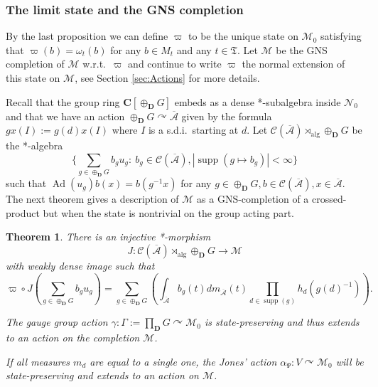 \documentclass[a4paper,12pt]{amsart}
\numberwithin{equation}{section}
\newtheorem{theo}{Theorem}[section]
\theoremstyle{definition}
\newcommand{\act}{\curvearrowright}
\newcommand{\al}{\alpha}
\newcommand{\oscrA}{{\overline{\mathscr{A}}}}
\DeclareMathOperator{\Ad}{Ad}
\DeclareMathOperator{\alg}{alg}
\newcommand{\scrC}{\mathscr C}
\newcommand{\C}{\mathbf C}
\newcommand{\D}{\mathbf D}
\newcommand{\ga}{\gamma}
\newcommand{\Ga}{\Gamma}
\newcommand{\Gd}{\oplus_\D G}
\newcommand{\scrM}{\mathscr M}
\newcommand{\scrN}{\mathscr N}
\DeclareMathOperator{\supp}{supp}
\newcommand{\fT}{\mathfrak T}
\begin{document}
\subsubsection{The limit state and the GNS completion}
By the last proposition we can define  $\varpi$ to be the unique state on $\scrM_0$ satisfying that $\varpi(b)=\omega_t(b)$ for any $b\in M_t$ and any $t\in\fT.$
Let $\scrM$ be the GNS completion of $\scrM$ w.r.t.~$\varpi$ and continue to write $\varpi$ the normal extension of this state on $\scrM$, see Section \ref{sec:Actions} for more details.

Recall that the group ring $\C[\Gd]$ embeds as a dense *-subalgebra inside $\scrN_0$ and that we have an action $\Gd\act\oscrA$ given by the formula
$gx(I):= g(d) x(I)$ where $I$ is a s.d.i.~starting at $d$.
Let $\scrC(\oscrA)\rtimes_{\alg} \Gd$ be the *-algebra 
$$\{\sum_{g\in \Gd} b_g u_g : \ b_g\in\scrC(\oscrA), |\supp(g\mapsto b_g)|<\infty\}$$
such that $\Ad(u_g) b(x) = b(g^{-1}x)$ for any $g\in\Gd, b\in\scrC(\oscrA), x\in \oscrA.$
The next theorem gives a description of $\scrM$ as a GNS-completion of a crossed-product but when the state is nontrivial on the group acting part.

\begin{theo}\label{omegaNC}
There is an injective *-morphism 
$$J:\scrC(\oscrA)\rtimes_{\alg} \Gd\to \scrM$$ 
with weakly dense image such that 
\begin{equation}\label{equa:varpi}\varpi\circ J(\sum_{g\in \Gd} b_g u_g) = \sum_{g\in \Gd} \left(\int_\oscrA b_g(t) d m_\oscrA(t) \prod_{d\in\supp(g)} h_d(g(d)^{-1}) \right).\end{equation}

The gauge group action $\ga:\Ga:=\prod_\D G\act \scrM_0$ is state-preserving and thus extends to an action on the completion $\scrM$.

If all measures $m_d$ are equal to a single one, the Jones' action $\al_\Psi:V\act \scrM_0$ will be state-preserving and extends to an action on $\scrM$.
\end{theo}
\end{document}
